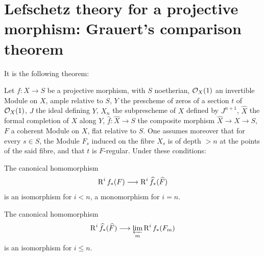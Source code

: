 \section[Lefschetz theory for a projective morphism: comparison]
{Lefschetz theory for a projective morphism: Grauert's comparison theorem} \label{XII.2}

\setcounter{equation}{13}
It is the following theorem:

\begin{theorem} \label{XII.2.1}
Let $f:X\to S$ be a projective morphism, with $S$ noetherian, $\mathcal{O}_X(1)$ an invertible Module on $X$, ample relative to $S$, $Y$ the prescheme of zeros of a section $t$ of $\mathcal{O}_X(1)$, $J$ the ideal defining $Y$, $X_n$ the subprescheme of $X$ defined by $J^{n+1}$, $\widehat{X}$ the formal completion of $X$ along $Y$, $\widehat{f}:\widehat{X}\to S$ the composite morphism $\widehat{X}\to X\to S$, $F$ a coherent Module on $X$, flat relative to $S$. One assumes moreover that for every $s\in S$, the Module $F_s$ induced on the fibre $X_s$ is of depth $>n$ at the points of the said fibre, and that $t$ is $F$-regular. Under these conditions:
\begin{enumeratei}
\item
The canonical homomorphism
\[
\R^if_\ast(F) \to \R^i\widehat{f}_\ast(\widehat{F})
\]
is an isomorphism for $i<n$, a monomorphism for $i=n$.
\item
The canonical homomorphism
\[
\R^i\widehat{f}_\ast(\widehat{F}) \to \varprojlim_m \R^if_\ast(F_m)
\]
is an isomorphism for $i\leq n$.
\end{enumeratei}
\end{theorem}


